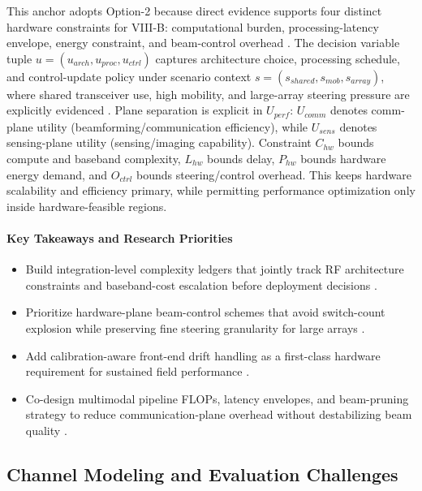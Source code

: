 This anchor adopts Option-2 because direct evidence supports four distinct hardware constraints for VIII-B: computational burden, processing-latency envelope, energy constraint, and beam-control overhead \cite{O_ISAC_134, O_ISAC_161, O_ISAC_171}. The decision variable tuple $u=(u_{arch},u_{proc},u_{ctrl})$ captures architecture choice, processing schedule, and control-update policy under scenario context $s=(s_{shared},s_{mob},s_{array})$, where shared transceiver use, high mobility, and large-array steering pressure are explicitly evidenced \cite{O_ISAC_134, O_ISAC_161, O_ISAC_171}. Plane separation is explicit in $U_{perf}$: $U_{comm}$ denotes comm-plane utility (beamforming/communication efficiency), while $U_{sens}$ denotes sensing-plane utility (sensing/imaging capability). Constraint $C_{hw}$ bounds compute and baseband complexity, $L_{hw}$ bounds delay, $P_{hw}$ bounds hardware energy demand, and $O_{ctrl}$ bounds steering/control overhead. This keeps hardware scalability and efficiency primary, while permitting performance optimization only inside hardware-feasible regions.

\paragraph{Key Takeaways and Research Priorities}
\begin{itemize}
    \item Build integration-level complexity ledgers that jointly track RF architecture constraints and baseband-cost escalation before deployment decisions \cite{O_ISAC_161, O_ISAC_162}.
    \item Prioritize hardware-plane beam-control schemes that avoid switch-count explosion while preserving fine steering granularity for large arrays \cite{O_ISAC_171}.
    \item Add calibration-aware front-end drift handling as a first-class hardware requirement for sustained field performance \cite{O_ISAC_162}.
    \item Co-design multimodal pipeline FLOPs, latency envelopes, and beam-pruning strategy to reduce communication-plane overhead without destabilizing beam quality \cite{O_ISAC_134}.
\end{itemize}

\subsection{Channel Modeling and Evaluation Challenges}

